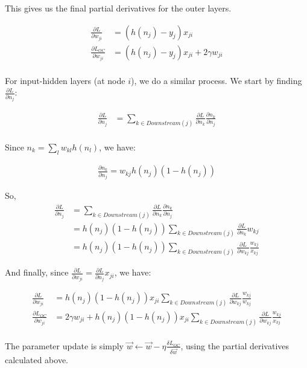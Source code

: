 \documentclass[fleqn]{homework}
\begin{document}
\begin{problem}{5}
    This gives us the final partial derivatives for the outer layers.

    \begin{align*}
      \frac{\partial L}{\partial w_{ji}} &= (h(n_j) - y_j) x_{ji} \\
      \frac{\partial L_{OC}}{\partial w_{ji}} &= (h(n_j) - y_j) x_{ji} + 2
                                                \gamma w_{ji} \\
    \end{align*}

    For input-hidden layers (at node $i$), we do a similar process.  We start by
    finding $\frac{\partial L}{\partial n_j}$:

    \begin{align*}
      \frac{\partial L}{\partial n_j}
      &= \sum_{k\in Downstream(j)} \frac{\partial L}{\partial n_k}
        \frac{\partial n_k}{\partial n_j} \\
    \end{align*}

    Since $n_k = \sum_l w_{kl}h(n_l)$, we have:

    \begin{align*}
      \frac{\partial n_k}{\partial n_j} = w_{kj} h(n_j)(1-h(n_j))
    \end{align*}

    So,
    \begin{align*}
      \frac{\partial L}{\partial n_j}
      &= \sum_{k\in Downstream(j)} \frac{\partial L}{\partial n_k}
        \frac{\partial n_k}{\partial n_j} \\
      &= h(n_j)(1-h(n_j)) \sum_{k\in Downstream(j)} \frac{\partial L}{\partial
        n_k} w_{kj}\\
      &= h(n_j)(1-h(n_j)) \sum_{k\in Downstream(j)} \frac{\partial L}{\partial
        w_{kj}} \frac{w_{kj}}{x_{kj}}
    \end{align*}

    And finally, since
    $\frac{\partial L}{\partial w_{ji}} = \frac{\partial L}{\partial n_j}
    x_{ji}$, we have:

    \begin{align*}
      \frac{\partial L}{\partial w_{ji}}
      &= h(n_j)(1-h(n_j)) x_{ji} \sum_{k\in Downstream(j)} \frac{\partial L}{\partial w_{kj}} \frac{w_{kj}}{w_{kj}} \\
      \frac{\partial L_{OC}}{\partial w_{ji}}
      &= 2 \gamma w_{ji} + h(n_j)(1-h(n_j)) x_{ji} \sum_{k\in Downstream(j)} \frac{\partial L}{\partial w_{kj}} \frac{w_{kj}}{x_{kj}} \\
    \end{align*}
  \end{problem}

  The parameter update is simply
  $\vec{w} \gets \vec{w} - \eta \frac{\delta L_{OC}}{\delta \vec{w}}$, using the
  partial derivatives calculated above.
\end{document}
